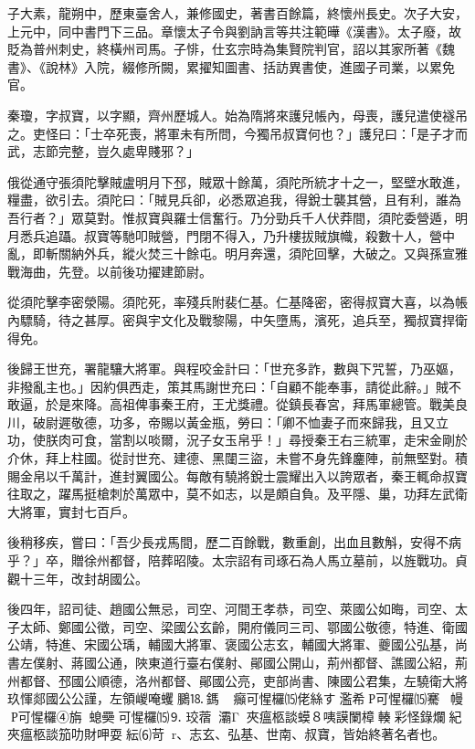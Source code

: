 \begin{pinyinscope}
 子大素，龍朔中，歷東臺舍人，兼修國史，著書百餘篇，終懷州長史。次子大安，上元中，同中書門下三品。章懷太子令與劉訥言等共注範曄《漢書》。太子廢，故貶為普州刺史，終橫州司馬。子悱，仕玄宗時為集賢院判官，詔以其家所著《魏書》、《說林》入院，綴修所闕，累擢知圖書、括訪異書使，進國子司業，以累免官。



 秦瓊，字叔寶，以字顯，齊州歷城人。始為隋將來護兒帳內，母喪，護兒遣使襚吊之。吏怪曰：「士卒死喪，將軍未有所問，今獨吊叔寶何也？」護兒曰：「是子才而武，志節完整，豈久處卑賤邪？」



 俄從通守張須陀擊賊盧明月下邳，賊眾十餘萬，須陀所統才十之一，堅壁水敢進，糧盡，欲引去。須陀曰：「賊見兵卻，必悉眾追我，得銳士襲其營，且有利，誰為吾行者？」眾莫對。惟叔寶與羅士信奮行。乃分勁兵千人伏莽間，須陀委營遁，明月悉兵追躡。叔寶等馳叩賊營，門閉不得入，乃升樓拔賊旗幟，殺數十人，營中亂，即斬關納外兵，縱火焚三十餘屯。明月奔還，須陀回擊，大破之。又與孫宣雅戰海曲，先登。以前後功擢建節尉。



 從須陀擊李密滎陽。須陀死，率殘兵附裴仁基。仁基降密，密得叔寶大喜，以為帳內驃騎，待之甚厚。密與宇文化及戰黎陽，中矢墮馬，濱死，追兵至，獨叔寶捍衛得免。



 後歸王世充，署龍驤大將軍。與程咬金計曰：「世充多詐，數與下咒誓，乃巫嫗，非撥亂主也。」因約俱西走，策其馬謝世充曰：「自顧不能奉事，請從此辭。」賊不敢逼，於是來降。高祖俾事秦王府，王尤獎禮。從鎮長春宮，拜馬軍總管。戰美良川，破尉遲敬德，功多，帝賜以黃金瓶，勞曰：「卿不恤妻子而來歸我，且又立功，使朕肉可食，當割以啖爾，況子女玉帛乎！」尋授秦王右三統軍，走宋金剛於介休，拜上柱國。從討世充、建德、黑闥三盜，未嘗不身先鋒鏖陣，前無堅對。積賜金帛以千萬計，進封翼國公。每敵有驍將銳士震耀出入以誇眾者，秦王輒命叔寶往取之，躍馬挺槍刺於萬眾中，莫不如志，以是頗自負。及平隱、巢，功拜左武衛大將軍，實封七百戶。



 後稍移疾，嘗曰：「吾少長戎馬間，歷二百餘戰，數重創，出血且數斛，安得不病乎？」卒，贈徐州都督，陪葬昭陵。太宗詔有司琢石為人馬立墓前，以旌戰功。貞觀十三年，改封胡國公。



 後四年，詔司徒、趙國公無忌，司空、河間王孝恭，司空、萊國公如晦，司空、太子太師、鄭國公徵，司空、梁國公玄齡，開府儀同三司、鄂國公敬德，特進、衛國公靖，特進、宋國公瑀，輔國大將軍、褒國公志玄，輔國大將軍、夔國公弘基，尚書左僕射、蔣國公通，陜東道行臺右僕射、鄖國公開山，荊州都督、譙國公紹，荊州都督、邳國公順德，洛州都督、鄖國公亮，吏部尚書、陳國公君集，左驍衛大將玖惲郯國公公謹，左領嵕唵蠼鵩⒙鎷𢥞塚癲可惺欏⒂佬絲す濫希Р可惺欏⒂騫幔Р可惺欏④旃螅奰可惺欏⒂⒐珓蓿⑹灞Γ⑼夾瘟柩談蟆８咦謨闌樟輳彩怪錄爛紀夾瘟柩談笳叻財呷耍紜⑹苛r、志玄、弘基、世南、叔寶，皆始終著名者也。




\end{pinyinscope}
